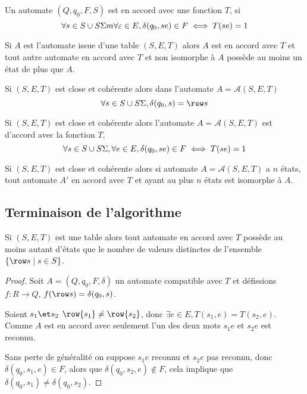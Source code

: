 \begin{definition}
	Un automate $(Q, q_0, F, S)$ est en accord avec une fonction $T$, si
	$$ \forall s \in S \cup S\Sigma m \forall \varepsilon \in E, \delta(q_0,se) \in F \iff T(se) = 1$$
\end{definition}

\begin{theorem}
	Si $A$ est l'automate issue d'une table $(S,E,T)$ alors $A$ est en accord avec $T$ et tout autre
	automate en accord avec $T$ et non isomorphe à $A$ possède au moins un état de plus que $A$.
\end{theorem}

\begin{lemma}
	Si $(S,E,T)$ est close et cohérente alors dans l'automate $A = \mathcal A (S,E,T)$
	$$\forall s \in S \cup S\alphabet, \delta(q_0,s) = \row s$$
\end{lemma}

\begin{lemma}
	Si $(S,E,T)$ est close et cohérente alors l'automate $A = \mathcal A (S,E,T)$
	est d'accord avec la fonction $T$, \ie
	$$\forall s \in S \cup S\Sigma, \forall e \in E, \delta(q_0,se) \in F \iff T(se) =1$$
\end{lemma}


\begin{lemma}
	Si $(S,E,T)$ est close et cohérente alors si automate $A = \mathcal A (S,E,T)$
	a $n$ états, tout automate $A'$ en accord avec $T$ et ayant au plus $n$ états est isomorphe à $A$.
\end{lemma}

\subsection{Terminaison de l'algorithme}

\begin{lemma}
	Si $(S,E,T)$ est une table alors tout automate en accord avec $T$ possède au
	moins autant d'états que le nombre de valeurs distinctes de l'ensemble $\setdef {\row s} {s \in S}$.
\end{lemma}

\begin{proof}
	Soit $A = (Q,q_0,F,\delta)$ un automate compatible avec $T$ et défissions
	$f: R \to Q$, $f(\row s) = \delta(q_0, s)$.

	Soient $s_1 \et s_2$ \tq $\row {s_1} \neq \row{s_2}$, donc $\exists e \in E, T(s_1,e) = T(s_2,e)$.
	Comme $A$ est en accord avec seulement l'un des deux mots $s_1e$ et $s_2e$ est reconnu.

	Sans perte de généralité on suppose $s_1e$ reconnu et $s_2e$ pas reconnu, donc
	$\delta (q_0, s_1, e) \in F$, alors que $\delta (q_0,s_2,e) \notin F$, cela implique que
	$\delta (q_0,s_1) \neq \delta (q_0,s_2)$.

\end{proof}

